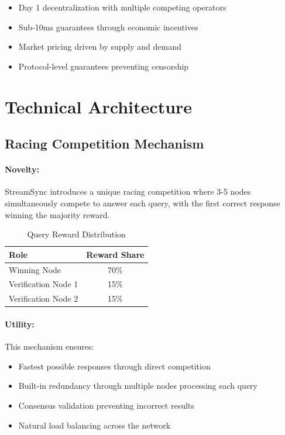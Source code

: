\documentclass[12pt,a4paper]{article}
\begin{document}
\begin{itemize}
    \item Day 1 decentralization with multiple competing operators
    \item Sub-10ms guarantees through economic incentives
    \item Market pricing driven by supply and demand
    \item Protocol-level guarantees preventing censorship
\end{itemize}

\section{Technical Architecture}

\subsection{Racing Competition Mechanism}

\paragraph{Novelty:} StreamSync introduces a unique racing competition where 3-5 nodes simultaneously compete to answer each query, with the first correct response winning the majority reward.

\begin{table}[h]
\centering
\begin{tabular}{lc}
\toprule
\textbf{Role} & \textbf{Reward Share} \\
\midrule
Winning Node & 70\% \\
Verification Node 1 & 15\% \\
Verification Node 2 & 15\% \\
\bottomrule
\end{tabular}
\caption{Query Reward Distribution}
\end{table}

\paragraph{Utility:} This mechanism ensures:
\begin{itemize}
    \item Fastest possible responses through direct competition
    \item Built-in redundancy through multiple nodes processing each query
    \item Consensus validation preventing incorrect results
    \item Natural load balancing across the network
\end{itemize}
\end{document}
